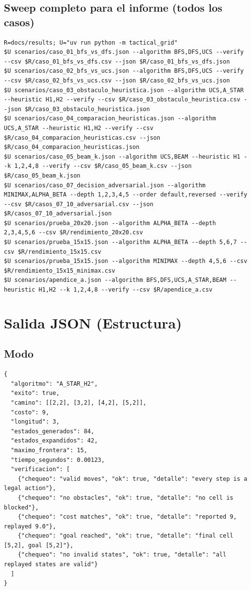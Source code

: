 \subsection{Sweep completo para el informe (todos los casos)}
\begin{verbatim}
R=docs/results; U="uv run python -m tactical_grid"
$U scenarios/caso_01_bfs_vs_dfs.json --algorithm BFS,DFS,UCS --verify --csv $R/caso_01_bfs_vs_dfs.csv --json $R/caso_01_bfs_vs_dfs.json
$U scenarios/caso_02_bfs_vs_ucs.json --algorithm BFS,DFS,UCS --verify --csv $R/caso_02_bfs_vs_ucs.csv --json $R/caso_02_bfs_vs_ucs.json
$U scenarios/caso_03_obstaculo_heuristica.json --algorithm UCS,A_STAR --heuristic H1,H2 --verify --csv $R/caso_03_obstaculo_heuristica.csv --json $R/caso_03_obstaculo_heuristica.json
$U scenarios/caso_04_comparacion_heuristicas.json --algorithm UCS,A_STAR --heuristic H1,H2 --verify --csv $R/caso_04_comparacion_heuristicas.csv --json $R/caso_04_comparacion_heuristicas.json
$U scenarios/caso_05_beam_k.json --algorithm UCS,BEAM --heuristic H1 --k 1,2,4,8 --verify --csv $R/caso_05_beam_k.csv --json $R/caso_05_beam_k.json
$U scenarios/caso_07_decision_adversarial.json --algorithm MINIMAX,ALPHA_BETA --depth 1,2,3,4,5 --order default,reversed --verify --csv $R/casos_07_10_adversarial.csv --json $R/casos_07_10_adversarial.json
$U scenarios/prueba_20x20.json --algorithm ALPHA_BETA --depth 2,3,4,5,6 --csv $R/rendimiento_20x20.csv
$U scenarios/prueba_15x15.json --algorithm ALPHA_BETA --depth 5,6,7 --csv $R/rendimiento_15x15.csv
$U scenarios/prueba_15x15.json --algorithm MINIMAX --depth 4,5,6 --csv $R/rendimiento_15x15_minimax.csv
$U scenarios/apendice_a.json --algorithm BFS,DFS,UCS,A_STAR,BEAM --heuristic H1,H2 --k 1,2,4,8 --verify --csv $R/apendice_a.csv
\end{verbatim}

\section{Salida JSON (Estructura)}
\label{sec:cli-salida}

\subsection{Modo }
\begin{verbatim}
{
  "algoritmo": "A_STAR_H2",
  "exito": true,
  "camino": [[2,2], [3,2], [4,2], [5,2]],
  "costo": 9,
  "longitud": 3,
  "estados_generados": 84,
  "estados_expandidos": 42,
  "maximo_frontera": 15,
  "tiempo_segundos": 0.00123,
  "verificacion": [
    {"chequeo": "valid moves", "ok": true, "detalle": "every step is a legal action"},
    {"chequeo": "no obstacles", "ok": true, "detalle": "no cell is blocked"},
    {"chequeo": "cost matches", "ok": true, "detalle": "reported 9, replayed 9.0"},
    {"chequeo": "goal reached", "ok": true, "detalle": "final cell [5,2], goal [5,2]"},
    {"chequeo": "no invalid states", "ok": true, "detalle": "all replayed states are valid"}
  ]
}
\end{verbatim}

